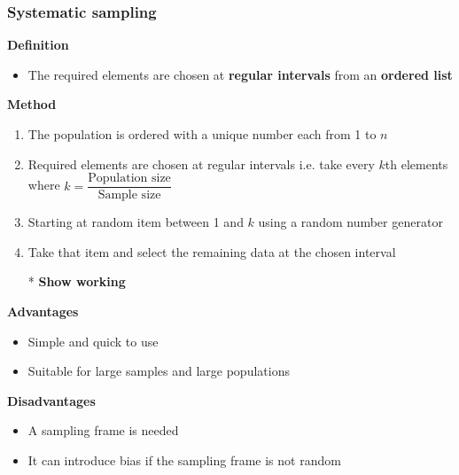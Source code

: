 \documentclass[fleqn, 11pt]{article}
\begin{document}
	\subsubsection{Systematic sampling}
	\textbf{Definition}
	\begin{itemize}
		\item The required elements are chosen at \textbf{regular intervals} from an \textbf{ordered list}
	\end{itemize}
	\textbf{Method}
	\begin{enumerate}
		\item The population is ordered with a unique number each from 1 to $n$
		\item Required elements are chosen at regular intervals i.e. take every $k$th elements where $k=\dfrac{\text{Population size}}{\text{Sample size}}$
		\item Starting at random item between 1 and $k$ using a random number generator
		\item Take that item and select the remaining data at the chosen interval
		\item[*] \textbf{Show working}
	\end{enumerate}
	\textbf{Advantages}
	\begin{itemize}
		\item Simple and quick to use
		\item Suitable for large samples and large populations
	\end{itemize}
	\textbf{Disadvantages}
	\begin{itemize}
		\item A sampling frame is needed
		\item It can introduce bias if the sampling frame is not random
	\end{itemize}
\end{document}
